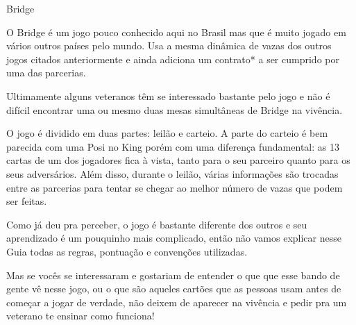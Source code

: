 \begin{subsecao}{Bridge}

O Bridge é um jogo pouco conhecido aqui no Brasil mas que é muito jogado em
vários outros países pelo mundo. Usa a mesma dinâmica de vazas dos outros jogos
citados anteriormente e ainda adiciona um contrato* a ser cumprido por uma das
parcerias.

Ultimamente alguns veteranos têm se interessado bastante pelo jogo e não é
difícil encontrar uma ou mesmo duas mesas simultâneas de Bridge na vivência.

O jogo é dividido em duas partes: leilão e carteio. A parte do carteio é bem
parecida com uma Posi no King porém com uma diferença fundamental: as 13 cartas
de um dos jogadores fica à vista, tanto para o seu parceiro quanto para os seus
adversários. Além disso, durante o leilão, várias informações são trocadas entre
as parcerias para tentar se chegar ao melhor número de vazas que podem ser
feitas.

Como já deu pra perceber, o jogo é bastante diferente dos outros e seu
aprendizado é um pouquinho mais complicado, então não vamos explicar nesse Guia
todas as regras, pontuação e convenções utilizadas.

Mas se vocês se interessaram e gostariam de entender o que que esse bando de
gente vê nesse jogo, ou o que são aqueles cartões que as pessoas usam antes de
começar a jogar de verdade, não deixem de aparecer na vivência e pedir pra um
veterano te ensinar como funciona!

\end{subsecao}
